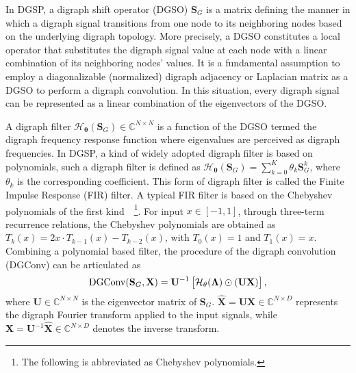 In DGSP, a digraph shift operator (DGSO) $\mathbf{S}_{G}$ is a matrix defining the manner in which a digraph signal transitions from one node to its neighboring nodes based on the underlying digraph topology. More precisely, a DGSO constitutes a local operator that substitutes the digraph signal value at each node with a linear combination of its neighboring nodes' values. It is a fundamental assumption to employ a diagonalizable (normalized) digraph adjacency or Laplacian matrix as a DGSO to perform a digraph convolution. In this situation, every digraph signal can be represented as a linear combination of the eigenvectors of the DGSO. 

A digraph filter $\mathcal{H}_{\mathbf{\theta}}(\mathbf{S}_{G}) \in \mathbb{C}^{N \times N}$ is a function of the DGSO termed the digraph frequency response function where eigenvalues are perceived as digraph frequencies. In DGSP, a kind of widely adopted digraph filter is based on polynomials, such a digraph filter is defined as $\mathcal{H}_{\mathbf{\theta}}(\mathbf{S}_{G}) = \sum^{K}_{k=0}{{\theta}_{k}\mathbf{S}_{G}^{k}}$, where ${\theta}_{k}$ is the corresponding coefficient. This form of digraph filter is called the Finite Impulse Response (FIR) filter. A typical FIR filter is based on the Chebyshev polynomials of the first kind~\citep{HAMMOND2011129}~\footnote{The following is abbreviated as Chebyshev polynomials.}. For input $x \in [-1, 1]$, through three-term recurrence relations, the Chebyshev polynomials are obtained as $T_{k}(x) = 2x\cdot{T}_{k-1}(x) - T_{k-2}(x)$, with $T_{0}(x) = 1$ and $T_{1}(x) = x$. Combining a polynomial based filter, the procedure of the digraph convolution (DGConv) can be articulated as
\begin{equation}\label{eq:digraph_conv_eigenvalue}
\centering
\mathrm{DGConv}(\mathbf{S}_{G}, \mathbf{X}) 
= \mathbf{U}^{-1}\left[\mathcal{H}_{\mathbf{\theta}}(\mathbf{\Lambda})\odot(\mathbf{U}\mathbf{X})\right],
\end{equation}
where $\mathbf{U} \in \mathbb{C}^{N \times N}$ is the eigenvector matrix of $\mathbf{S}_{G}$. $\hat{\mathbf{X}} = \mathbf{U}\mathbf{X} \in \mathbb{C}^{N \times D}$ represents the digraph Fourier transform applied to the input signals, while $\mathbf{X} = \mathbf{U}^{-1}\hat{\mathbf{X}} \in \mathbb{C}^{N \times D}$ denotes the inverse transform.

